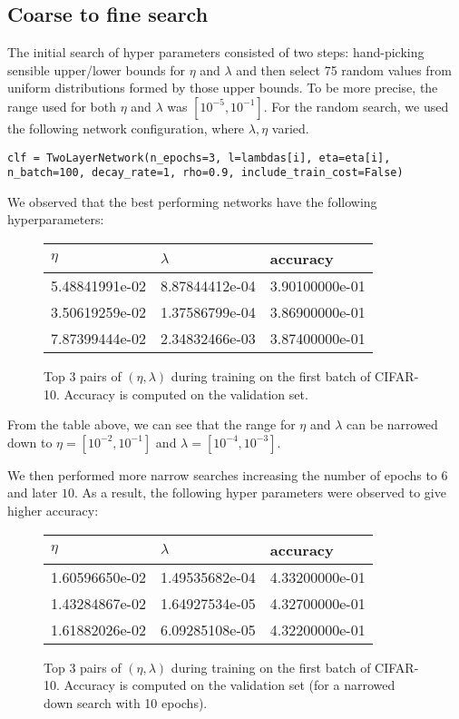 \documentclass[10pt,a4paper]{article}
\begin{document}
\subsection*{Coarse to fine search}
The initial search of hyper parameters consisted of two steps: hand-picking sensible upper/lower bounds for $\eta$ and $\lambda$ and then select 75 random values from uniform distributions formed by those upper bounds. To be more precise, the range used for both $\eta$ and $\lambda$ was $[10^{-5},10^{-1}]$. For the random search, we used the following network configuration, where $\lambda,\eta$ varied.
\begin{lstlisting}[breaklines]
clf = TwoLayerNetwork(n_epochs=3, l=lambdas[i], eta=eta[i], n_batch=100, decay_rate=1, rho=0.9, include_train_cost=False)
\end{lstlisting}
We observed that the best performing networks have the following hyperparameters:

\begin{figure}[H]
	\centering
\begin{tabular}{|l|l|l|}
	\hline
	$\eta$ & $\lambda$ & accuracy \\
	\hline
	5.48841991e-02 & 8.87844412e-04 & 3.90100000e-01 \\
	3.50619259e-02 & 1.37586799e-04 & 3.86900000e-01 \\
	7.87399444e-02 & 2.34832466e-03 &  3.87400000e-01 \\
	\hline
\end{tabular}
\caption{Top 3 pairs of $(\eta,\lambda)$ during training on the first batch of CIFAR-10. Accuracy is computed on the validation set.}
\end{figure}

From the table above, we can see that the range for $\eta$ and $\lambda$ can be narrowed down to $\eta=[10^{-2},10^{-1}]$ and $\lambda=[10^{-4},10^{-3}]$.

We then performed more narrow searches increasing the number of epochs to $6$ and later $10$. As a result, the following hyper parameters were observed to give higher accuracy:

\begin{figure}[H]
	\centering
	\begin{tabular}{|l|l|l|}
		\hline
		$\eta$ & $\lambda$ & accuracy \\
		\hline
		1.60596650e-02 & 1.49535682e-04 & 4.33200000e-01 \\
		1.43284867e-02 & 1.64927534e-05 & 4.32700000e-01 \\
		1.61882026e-02 & 6.09285108e-05 &  4.32200000e-01 \\
		\hline
	\end{tabular}
	\caption{Top 3 pairs of $(\eta,\lambda)$ during training on the first batch of CIFAR-10. Accuracy is computed on the validation set (for a narrowed down search with 10 epochs).}
\end{figure}
\end{document}
